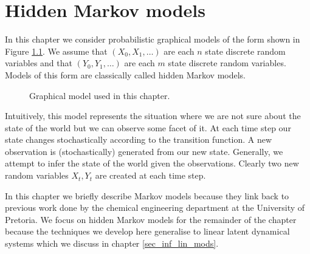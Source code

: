 \chapter{Hidden Markov models}
\label{sec_hmm}
In this chapter we consider probabilistic graphical models of the form shown in Figure \ref{fig_linmod}. We assume that  $(X_0, X_1,\hdots)$ are each $n$ state discrete random variables and that $(Y_0, Y_1,\hdots)$ are each $m$ state discrete random variables. Models of this form are classically called hidden Markov models.
\begin{figure}[H] 
\centering
{}
\caption{Graphical model used in this chapter.}
\label{fig_linmod}
\end{figure}
Intuitively, this model represents the situation where we are not sure about the state of the world but we can observe some facet of it. At each time step our state changes stochastically according to the transition function. A new observation is (stochastically) generated from our new state. Generally, we attempt to infer the state of the world given the observations. Clearly two new random variables $X_t, Y_t$ are created at each time step.

In this chapter we briefly describe Markov models because they link back to previous work done by the chemical engineering department at the University of Pretoria. We focus on hidden Markov models for the remainder of the chapter because the techniques we develop here generalise to linear latent dynamical systems which we discuss in chapter \ref{sec_inf_lin_mods}. 

